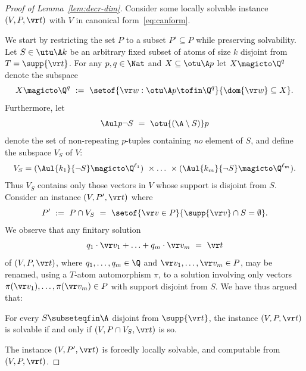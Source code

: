 \begin{proof}[Proof of Lemma~\ref{lem:decr-dim}]
Consider some locally solvable instance $(V, P, \vr t)$ with $V$ in canonical form~\eqref{eq:canform}.

We start by restricting the set $P$ to a subset $P'\subseteq P$ while preserving solvability.
Let $S\in\utu \A k$ be an arbitrary fixed subset of atoms of size $k$ disjoint from $T = \supp {\vr t}$.
For any $p, q \in\Nat$ and $X\subseteq \otu \A p$
let
$X \magicto \Q^q$ denote the subspace
\[
X \magicto \Q^q \ := \ \setof{\vr w : \otu \A p \tofin \Q^q}{\dom{\vr w} \subseteq X}.
\]
Furthermore, let 
\[
\Aul  p {\neg S} \ = \ \otu {(\A\setminus S)} p
\]
denote the set of non-repeating $p$-tuples containing \emph{no} element of $S$, and 
define the subspace $V_S$ of $V$:
\begin{align} \label{eq:VS}
V_S  =  
({\Aul {k_1} {\neg S}} \magicto \Q^{\ell_1}) 
\ \times \ldots \ \times
({\Aul {k_m} {\neg S}} \magicto \Q^{\ell_m}).
\end{align}
%
Thus $V_S$ contains only those vectors in $V$ whose support is disjoint from $S$.
Consider an instance $(V, P', \vr t)$ where 
$$
P'   \ := \ P \cap V_S \ = \ \setof{\vr v\in P}{\supp {\vr v} \cap S = \emptyset}.
$$
%
We observe that any finitary solution 
\[
q_1 \cdot \vr v_1 + \ldots + q_m \cdot \vr v_m \ = \ \vr t
\]
of $(V, P, \vr t)$, where $q_1, \ldots, q_m \in \Q$ and $\vr v_1, \ldots, \vr v_m \in P$, 
may be renamed, using a $T$-atom automorphism $\pi$, to a solution involving only
vectors $\pi(\vr v_1), \ldots, \pi(\vr v_m) \in P$ with support disjoint from $S$. 
We have thus argued that:
%
\begin{claim} \label{claim:instanceS}
For every $S\subseteqfin\A$ disjoint from $\supp {\vr t}$, the instance
$(V, P, \vr t)$ is solvable if and only if $(V, P\cap V_S, \vr t)$ is so.
\end{claim}
%
\noindent
The instance $(V, P', \vr t)$ is forcedly locally solvable, and computable from $(V, P, \vr t)$.


\end{proof}
